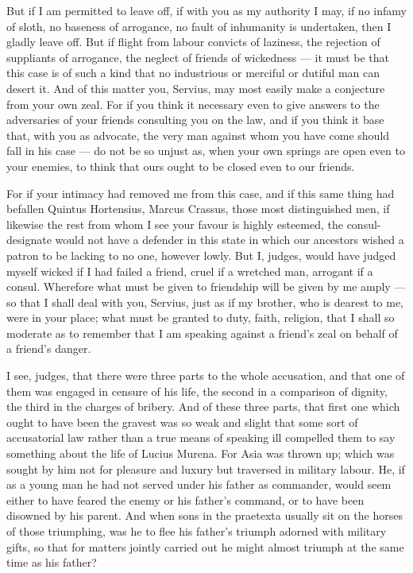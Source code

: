  But if I am permitted to leave off, if with you as my authority I may, if no infamy of sloth, no baseness of arrogance, no fault of inhumanity is undertaken, then I gladly leave off. But if flight from labour convicts of laziness, the rejection of suppliants of arrogance, the neglect of friends of wickedness --- it must be that this case is of such a kind that no industrious or merciful or dutiful man can desert it. And of this matter you, Servius, may most easily make a conjecture from your own zeal. For if you think it necessary even to give answers to the adversaries of your friends consulting you on the law, and if you think it base that, with you as advocate, the very man against whom you have come should fall in his case --- do not be so unjust as, when your own springs are open even to your enemies, to think that ours ought to be closed even to our friends.

 For if your intimacy had removed me from this case, and if this same thing had befallen Quintus Hortensius, Marcus Crassus, those most distinguished men, if likewise the rest from whom I see your favour is highly esteemed, the consul-designate would not have a defender in this state in which our ancestors wished a patron to be lacking to no one, however lowly. But I, judges, would have judged myself wicked if I had failed a friend, cruel if a wretched man, arrogant if a consul. Wherefore what must be given to friendship will be given by me amply --- so that I shall deal with you, Servius, just as if my brother, who is dearest to me, were in your place; what must be granted to duty, faith, religion, that I shall so moderate as to remember that I am speaking against a friend's zeal on behalf of a friend's danger.

 I see, judges, that there were three parts to the whole accusation, and that one of them was engaged in censure of his life, the second in a comparison of dignity, the third in the charges of bribery. And of these three parts, that first one which ought to have been the gravest was so weak and slight that some sort of accusatorial law rather than a true means of speaking ill compelled them to say something about the life of Lucius Murena. For Asia was thrown up; which was sought by him not for pleasure and luxury but traversed in military labour. He, if as a young man he had not served under his father as commander, would seem either to have feared the enemy or his father's command, or to have been disowned by his parent. And when sons in the praetexta usually sit on the horses of those triumphing, was he to flee his father's triumph adorned with military gifts, so that for matters jointly carried out he might almost triumph at the same time as his father?

